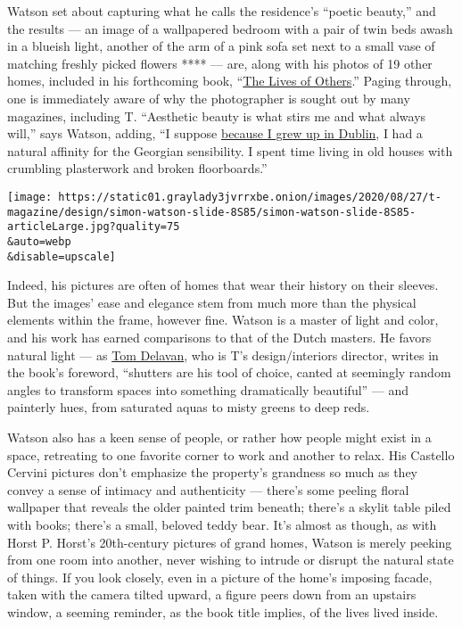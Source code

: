 Watson set about capturing what he calls the residence's ``poetic
beauty,'' and the results --- an image of a wallpapered bedroom with a
pair of twin beds awash in a blueish light, another of the arm of a pink
sofa set next to a small vase of matching freshly picked flowers ****
--- are, along with his photos of 19 other homes, included in his
forthcoming book,
``\href{https://www.rizzoliusa.com/book/9780847869008/}{The Lives of
Others}.'' Paging through, one is immediately aware of why the
photographer is sought out by many magazines, including T. ``Aesthetic
beauty is what stirs me and what always will,'' says Watson, adding, ``I
suppose
\href{https://www.nytimes3xbfgragh.onion/2019/08/27/t-magazine/simon-watson-home-dublin.html}{because
I grew up in Dublin}, I had a natural affinity for the Georgian
sensibility. I spent time living in old houses with crumbling
plasterwork and broken floorboards.''

\texttt{[image: https://static01.graylady3jvrrxbe.onion/images/2020/08/27/t-magazine/design/simon-watson-slide-8S85/simon-watson-slide-8S85-articleLarge.jpg?quality=75\\\&auto=webp\\\&disable=upscale]}

Indeed, his pictures are often of homes that wear their history on their
sleeves. But the images' ease and elegance stem from much more than the
physical elements within the frame, however fine. Watson is a master of
light and color, and his work has earned comparisons to that of the
Dutch masters. He favors natural light --- as
\href{https://www.nytimes3xbfgragh.onion/by/tom-delavan}{Tom Delavan},
who is T's design/interiors director, writes in the book's foreword,
``shutters are his tool of choice, canted at seemingly random angles to
transform spaces into something dramatically beautiful'' --- and
painterly hues, from saturated aquas to misty greens to deep reds.

Watson also has a keen sense of people, or rather how people might exist
in a space, retreating to one favorite corner to work and another to
relax. His Castello Cervini pictures don't emphasize the property's
grandness so much as they convey a sense of intimacy and authenticity
--- there's some peeling floral wallpaper that reveals the older painted
trim beneath; there's a skylit table piled with books; there's a small,
beloved teddy bear. It's almost as though, as with Horst P. Horst's
20th-century pictures of grand homes, Watson is merely peeking from one
room into another, never wishing to intrude or disrupt the natural state
of things. If you look closely, even in a picture of the home's imposing
facade, taken with the camera tilted upward, a figure peers down from an
upstairs window, a seeming reminder, as the book title implies, of the
lives lived inside.

